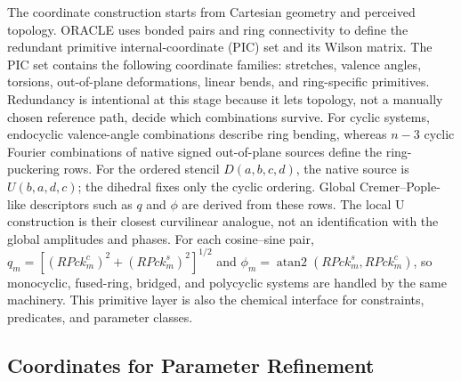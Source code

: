 \documentclass[aip,jcp,reprint,longbibliography,floatfix]{revtex4-2}
\begin{document}
The coordinate construction starts from Cartesian geometry and perceived
topology. ORACLE uses bonded pairs and ring connectivity to define the
redundant primitive internal-coordinate (PIC) set and its Wilson matrix. The
PIC set contains the following coordinate families: stretches, valence
angles, torsions, out-of-plane deformations,
linear bends, and ring-specific primitives. Redundancy is intentional at this
stage because it lets topology, not a manually chosen reference path, decide
which combinations survive. For cyclic systems, endocyclic valence-angle
combinations describe ring bending, whereas \(n-3\) cyclic Fourier
combinations of native signed out-of-plane sources define the ring-puckering
rows. For the ordered stencil \(D(a,b,c,d)\), the native source is
\(U(b,a,d,c)\); the dihedral fixes only the cyclic ordering. Global
Cremer--Pople-like descriptors such as $q$ and $\phi$ are derived from these
rows. The local U construction is their closest curvilinear analogue, not an
identification with the global amplitudes and phases.  For each cosine--sine
pair, \(q_m=[(RPck_m^c)^2+(RPck_m^s)^2]^{1/2}\) and
\(\phi_m=\operatorname{atan2}(RPck_m^s,RPck_m^c)\), so
monocyclic, fused-ring, bridged, and polycyclic systems are handled by the
same machinery.\cite{CremerPople1975} This
primitive layer is also the chemical interface for constraints, predicates,
and parameter classes.


\subsection{Coordinates for Parameter Refinement}
\end{document}
